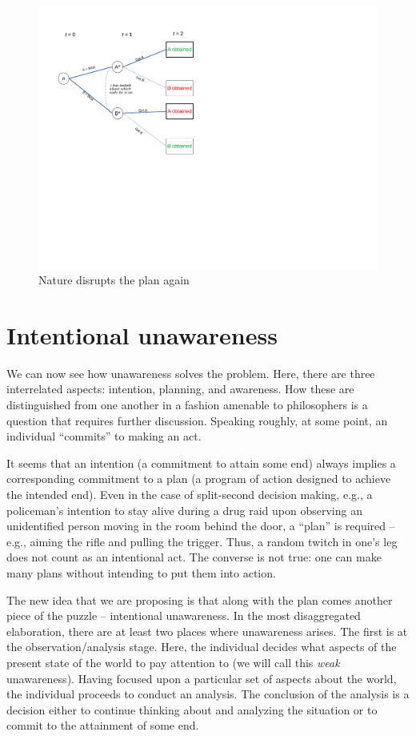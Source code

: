 \documentclass[
11pt,
titlepage,
reqno,
]{article}%
\theoremstyle{definition}
\begin{document}
\begin{figure}[h!]
	\centering
	\includegraphics*[page=10,trim = 0 3.5in 0in 0in,scale=.65]{Awareness_Diagrams_All}
	\caption{Nature disrupts the plan again\label{Diag: p-10}}%
\end{figure}

\section*{Intentional unawareness}

We can now see how unawareness solves the problem. Here, there are three interrelated aspects: intention, planning, and awareness. How these are distinguished from one another in  a fashion amenable to philosophers is a question that requires further discussion. Speaking roughly, at some point, an individual ``commits'' to making an act.

It seems that an intention (a commitment to attain some end) always implies a corresponding commitment to a plan (a program of action designed to achieve the intended end).  Even in the case of split-second decision making, e.g., a policeman's intention to stay alive during a drug raid upon observing an unidentified person moving in the room behind the door, a ``plan'' is required -- e.g., aiming the rifle and pulling the trigger. Thus, a random twitch in one's leg does not count as an intentional act. The converse is not true: one can make many plans without intending to put them into action.

The new idea that we are proposing is that along with the plan comes another piece of the puzzle -- intentional unawareness. In the most disaggregated elaboration, there are at least two places where unawareness arises. The first is at the observation/analysis stage. Here, the individual decides what aspects of the present state of the world to pay attention to (we will call this \textit{weak} unawareness). Having focused upon a particular set of aspects about the world, the individual proceeds to conduct an analysis. The conclusion of the analysis is a decision either to continue thinking about and analyzing the situation or to commit to the attainment of some end. 
\end{document}
